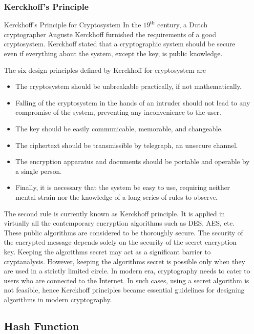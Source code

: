 \documentclass[british]{article}
\begin{document}
\subsubsection{Kerckhoff\textquoteright s Principle}

Kerckhoff's Principle for Cryptosystem In the $19^{\text{th}}$ century,
a Dutch cryptographer Auguste Kerckhoff furnished the requirements
of a good cryptosystem. Kerckhoff stated that a cryptographic system
should be secure even if everything about the system, except the key,
is public knowledge.

The six design principles defined by Kerckhoff for cryptosystem are
\textminus{}
\begin{itemize}
\item The cryptosystem should be unbreakable practically, if not mathematically.
\item Falling of the cryptosystem in the hands of an intruder should not
lead to any compromise of the system, preventing any inconvenience
to the user.
\item The key should be easily communicable, memorable, and changeable.
\item The ciphertext should be transmissible by telegraph, an unsecure channel.
\item The encryption apparatus and documents should be portable and operable
by a single person.
\item Finally, it is necessary that the system be easy to use, requiring
neither mental strain nor the knowledge of a long series of rules
to observe.
\end{itemize}
The second rule is currently known as Kerckhoff principle. It is applied
in virtually all the contemporary encryption algorithms such as DES,
AES, etc. These public algorithms are considered to be thoroughly
secure. The security of the encrypted message depends solely on the
security of the secret encryption key. Keeping the algorithms secret
may act as a significant barrier to cryptanalysis. However, keeping
the algorithms secret is possible only when they are used in a strictly
limited circle. In modern era, cryptography needs to cater to users
who are connected to the Internet. In such cases, using a secret algorithm
is not feasible, hence Kerckhoff principles became essential guidelines
for designing algorithms in modern cryptography.

\subsection{Hash Function}
\end{document}
